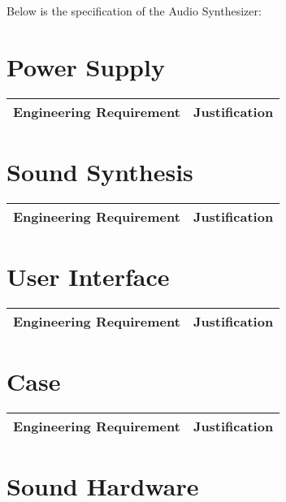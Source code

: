 \documentclass{article}
\begin{document}
\newenvironment{frcseries}{\fontfamily{frc}\selectfont}{}
\newcommand{\textfrc}[1]{{\frcseries#1}}
\newcommand{\mathfrc}[1]{\text{\textfrc{#1}}}

Below is the specification of the Audio Synthesizer:

\section{Power Supply}

\begin{tabular}{|p{3in}|p{3in}|}
\hline
Engineering Requirement & Justification \\
\hline
\end{tabular}

\section{Sound Synthesis}

\begin{tabular}{|p{3in}|p{3in}|}
\hline
Engineering Requirement & Justification \\
\hline
\end{tabular}


\section{User Interface}

\begin{tabular}{|p{3in}|p{3in}|}
\hline
Engineering Requirement & Justification \\
\hline
\end{tabular}

\section{Case}

\begin{tabular}{|p{3in}|p{3in}|}
\hline
Engineering Requirement & Justification \\
\hline
\end{tabular}


\section{Sound Hardware}
\end{document}
